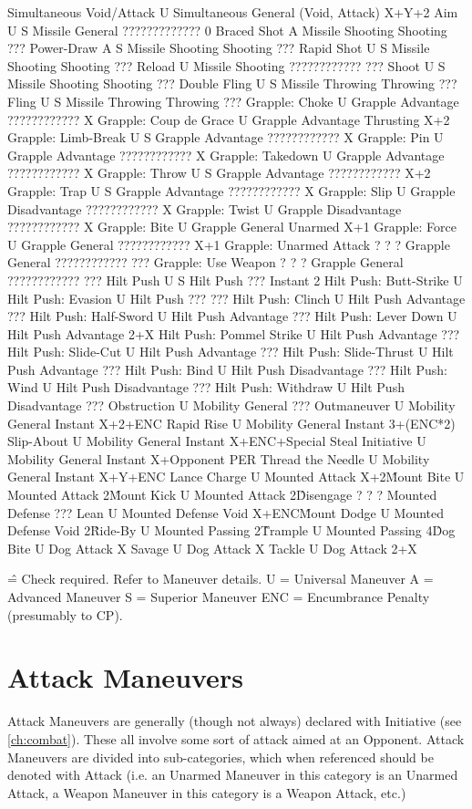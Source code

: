 \documentclass[oneside,11pt,english]{book}
\begin{document}
Simultaneous Void/Attack U Simultaneous General (Void, Attack) X+Y+2 
Aim U S Missile General ????????????? 0 
Braced Shot A Missile Shooting Shooting ???
Power-Draw A S Missile Shooting Shooting ??? 
Rapid Shot U S Missile Shooting Shooting ??? 
Reload U Missile Shooting ???????????? ??? 
Shoot U S Missile Shooting Shooting ??? 
Double Fling U S Missile Throwing Throwing ??? 
Fling U S Missile Throwing Throwing ??? 
Grapple: Choke U Grapple Advantage ???????????? X 
Grapple: Coup de Grace U Grapple Advantage Thrusting X+2 
Grapple: Limb-Break U S Grapple Advantage ???????????? X 
Grapple: Pin U Grapple Advantage ???????????? X 
Grapple: Takedown U Grapple Advantage ???????????? X 
Grapple: Throw U S Grapple Advantage ???????????? X+2 
Grapple: Trap U S Grapple Advantage ???????????? X 
Grapple: Slip U Grapple Disadvantage ???????????? X 
Grapple: Twist U Grapple Disadvantage ???????????? X 
Grapple: Bite U Grapple General Unarmed X+1 
Grapple: Force U Grapple General ???????????? X+1 
Grapple: Unarmed Attack ? ? ? Grapple General ???????????? ??? 
Grapple: Use Weapon ? ? ? Grapple General ???????????? ??? 
Hilt Push U S Hilt Push ??? Instant 2 
Hilt Push: Butt-Strike U 
Hilt Push: Evasion U Hilt Push ??? ??? 
Hilt Push: Clinch U Hilt Push Advantage ??? 
Hilt Push: Half-Sword U Hilt Push Advantage ??? 
Hilt Push: Lever Down U Hilt Push Advantage 2+X 
Hilt Push: Pommel Strike U Hilt Push Advantage ??? 
Hilt Push: Slide-Cut U Hilt Push Advantage ??? 
Hilt Push: Slide-Thrust U Hilt Push Advantage ??? 
Hilt Push: Bind U Hilt Push Disadvantage ??? 
Hilt Push: Wind U Hilt Push Disadvantage ??? 
Hilt Push: Withdraw U Hilt Push Disadvantage ??? 
Obstruction U Mobility General ??? 
Outmaneuver U Mobility General Instant X+2+ENC 
Rapid Rise U Mobility General Instant 3+(ENC*2) 
Slip-About U Mobility General Instant X+ENC+Special 
Steal Initiative U Mobility General Instant X+Opponent PER 
Thread the Needle U Mobility General Instant X+Y+ENC 
Lance Charge U Mounted Attack X+2\^ 
Mount Bite U Mounted Attack 2\^ 
Mount Kick U Mounted Attack 2\^ 
Disengage ? ? ? Mounted Defense ??? 
Lean U Mounted Defense Void X+ENC\^ 
Mount Dodge U Mounted Defense Void 2\^ 
Ride-By U Mounted Passing 2\^ 
Trample U Mounted Passing 4\^ 
Dog Bite U Dog Attack X 
Savage U Dog Attack X 
Tackle U Dog Attack 2+X 

\^ = Check required. Refer to Maneuver details. 
U = Universal Maneuver
A = Advanced Maneuver 
S = Superior Maneuver 
ENC = Encumbrance Penalty (presumably to CP). 

\section{Attack Maneuvers}
Attack Maneuvers are generally (though not always) declared with Initiative (see \autoref{ch:combat}). These all 
involve some sort of attack aimed at an Opponent. Attack Maneuvers are divided into sub-categories, 
which when referenced should be denoted with Attack (i.e. an Unarmed Maneuver in this category is an 
Unarmed Attack, a Weapon Maneuver in this category is a Weapon Attack, etc.) 
\end{document}
